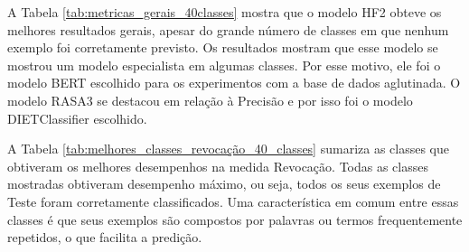 A Tabela \ref{tab:metricas_gerais_40classes} mostra que o modelo HF2 obteve os melhores resultados gerais, apesar do grande número de classes em que nenhum exemplo foi corretamente previsto. Os resultados mostram que esse modelo se mostrou um modelo especialista em algumas classes. Por esse motivo, ele foi o modelo BERT escolhido para os experimentos com a base de dados aglutinada. O modelo RASA3 se destacou em relação à Precisão e por isso foi o modelo DIETClassifier escolhido. 

\begin{table}[!ht]
\centering
\caption{Métricas de avaliação ponderadas pelo número de exemplos de cada classe (base de dados com 40 classes)}
\label{tab:metricas_gerais_40classes}
\end{table}

A Tabela \ref{tab:melhores_classes_revocação_40_classes} sumariza as classes que obtiveram os melhores desempenhos na medida Revocação. Todas as classes mostradas obtiveram desempenho máximo, ou seja, todos os seus exemplos de Teste foram corretamente classificados. Uma característica em comum entre essas classes é que seus exemplos são compostos por palavras ou termos frequentemente repetidos, o que facilita a predição.

